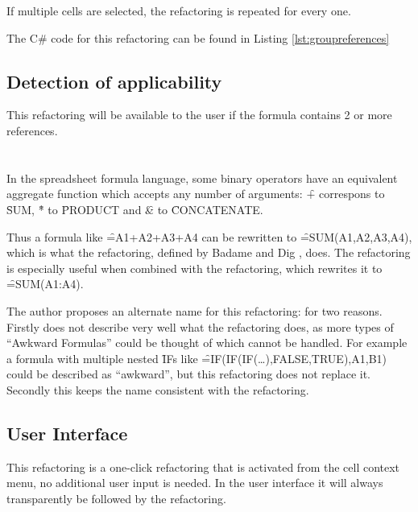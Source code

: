 If multiple cells are selected, the refactoring is repeated for every one.

The C\# code for this refactoring can be found in Listing \ref{lst:groupreferences}

\subsection{Detection of applicability}

This refactoring will be available to the user if the formula contains 2 or more references.

\section{}
\label{refac:introduceaggregate}

In the spreadsheet formula language, some binary operators have an equivalent aggregate function which accepts any number of arguments: \f{+} correspons to \f{SUM}, \f{*} to \f{PRODUCT} and \f{\&} to \f{CONCATENATE}.

Thus a formula like \f{=A1+A2+A3+A4} can be rewritten to \f{=SUM(A1,A2,A3,A4)}, which is what the  refactoring, defined by Badame and Dig \cite{badame2012refactoring}, does.
The refactoring is especially useful when combined with the  refactoring, which rewrites it to \f{=SUM(A1:A4)}.

The author proposes an alternate name for this refactoring:  for two reasons.
Firstly  does not describe very well what the refactoring does, as more types of ``Awkward Formulas'' could be thought of which cannot be handled.
For example a formula with multiple nested \f{IF}s like \f{=IF(IF(IF(\ldots),FALSE,TRUE),A1,B1)} could be described as ``awkward'', but this refactoring does not replace it.
Secondly this keeps the name consistent with the  refactoring.

\subsection{User Interface}

This refactoring is a one-click refactoring that is activated from the cell context menu, no additional user input is needed.
In the user interface it will always transparently be followed by the  refactoring.

